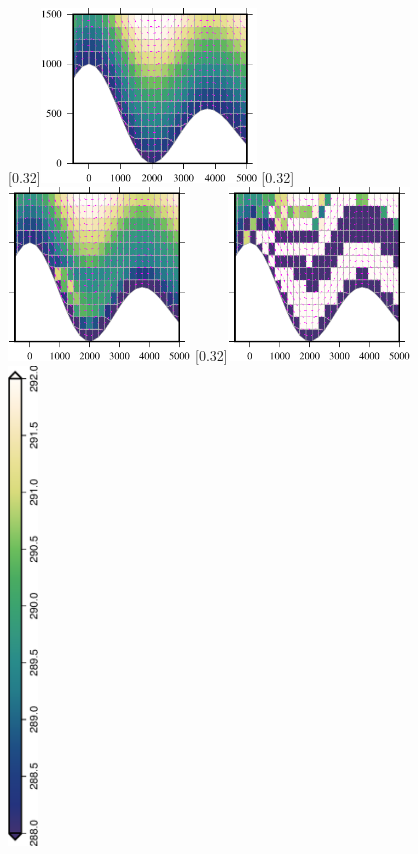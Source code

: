 \documentclass[a4paper,11pt]{article}
\begin{document}
\begin{figure}
\centering
{}[0.32\linewidth]{\hspace*{-1em}\includegraphics[width=2.25in]{slantedCell1000.pdf}}
[0.32\linewidth]{\hspace*{1em}\includegraphics[width=1.9in]{slantedCell1500.pdf}}
[0.32\linewidth]{\includegraphics[width=1.9in]{slantedCell2040.pdf}}
%
\vspace{1em} \\
\includegraphics[height=5in,angle=270]{slantedCellLegend.eps}

\end{figure}
\end{document}
